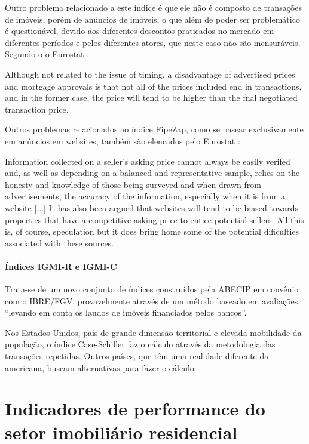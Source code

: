 \documentclass[
	12pt,				%
	oneside,			%
	a4paper,			%
	chapter=TITLE,		%
	section=TITLE,		%
	english,			%
	brazil				%
	]{abntex2}
\begin{document}
Outro problema relacionado a este índice é que ele não é composto de transações
de imóveis, porém de anúncios de imóveis, o que além de poder ser problemático é
questionável, devido aos diferentes descontos praticados no mercado em
diferentes períodos e pelos diferentes atores, que neste caso não são
mensuráveis. Segundo o o Eurostat \autocite*[126]{rppi}:
\begin{citacao}
Although not related to the issue of timing, a disadvantage of advertised
prices and mortgage approvals is that not all of the prices included end in
transactions, and in the former case, the price will tend to be higher than the
fnal negotiated transaction price.
\end{citacao}
Outros problemas relacionados ao índice FipeZap, como se basear exclusivamente
em anúncios em websites, também são elencados pelo Eurostat \autocite*[104]{rppi}:
\begin{citacao}
Information collected on a seller’s asking price cannot always be easily
verifed and, as well as depending on a balanced and representative sample,
relies on the honesty and knowledge of those being surveyed and when drawn from
advertisements, the accuracy of the information, especially when it is from a
website [...] It has also been argued that websites will tend to be biased
towards properties that have a competitive asking price to entice potential
sellers. All this is, of course, speculation but it does bring home some of the
potential dificulties associated with these sources.
\end{citacao}
\hypertarget{uxedndices-igmi-r-e-igmi-c}{%
\paragraph{Índices IGMI-R e IGMI-C}\label{uxedndices-igmi-r-e-igmi-c}}

Trata-se de um novo conjunto de índices construídos pela \gls{ABECIP} em
convênio com o \gls{IBRE}/\gls{FGV}, provavelmente através de um método baseado
em avaliações, ``levando em conta os laudos de imóveis financiados pelos bancos''.
\begin{citacao}
Nos Estados Unidos, país de grande dimensão territorial e elevada mobilidade
da população, o índice Case-Schiller faz o cálculo através da metodologia das
transações repetidas. Outros países, que têm uma realidade diferente da
americana, buscam alternativas para fazer o cálculo.
\end{citacao}
\hypertarget{indicadores-de-performance-do-setor-imobiliuxe1rio-residencial}{%
\section{Indicadores de performance do setor imobiliário residencial}\label{indicadores-de-performance-do-setor-imobiliuxe1rio-residencial}}
\end{document}
